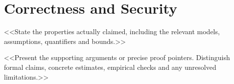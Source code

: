 \section{Correctness and Security}\label{sec:security}
<<State the properties actually claimed, including the relevant models,
assumptions, quantifiers and bounds.>>

<<Present the supporting arguments or precise proof pointers. Distinguish formal
claims, concrete estimates, empirical checks and any unresolved limitations.>>
